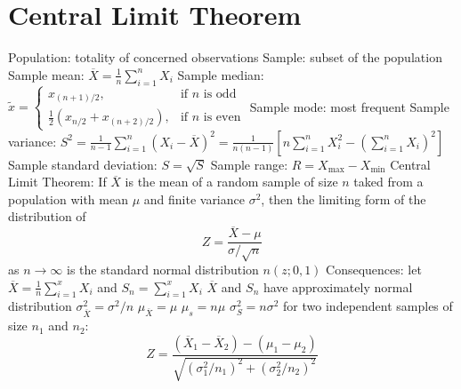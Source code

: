 \documentclass[a4paper,11pt]{article}
\begin{document}
	\section{Central Limit Theorem}
	\begin{outline}[enumerate]
		\1 Population: totality of concerned observations
		\1 Sample: subset of the population
			\2 Sample mean: $\overline{X} = \frac{1}{n}\sum_{i = 1}^{n} X_{i}$	
			\2 Sample median: $\tilde{x} = \left\{\begin{array}{ll}
				x_{\left(n + 1\right)/2}, & \text{if $n$ is odd} \\
				\frac{1}{2}\left(x_{n/2} + x_{\left(n + 2\right)/2}\right), & \text{if $n$ is even}
			\end{array} \right.$ 
			\2 Sample mode: most frequent
			\2 Sample variance: $S^2 = \frac{1}{n - 1}\sum_{i = 1}^{n} \left(X_{i} - \overline{X}\right)^{2} = \frac{1}{n\left(n - 1\right)} \left[n\sum_{i = 1}^{n}X_{i}^{2} - \left(\sum_{i = 1}^{n} X_{i}\right)^2\right]$
			\2 Sample standard deviation: $S = \sqrt{S}$
			\2 Sample range: $R = X_{\text{max}} - X_{\text{min}}$
		\1 Central Limit Theorem: If $\overline{X}$ is the mean of a random sample of size $n$ taked from a population with mean $\mu$ and finite variance $\sigma^{2}$, then the limiting form of the distribution of 
		\begin{equation}
			Z = \frac{\overline{X} - \mu}{\sigma / \sqrt{n}}
		\end{equation}	
		as $n \to \infty$ is the standard normal distribution $n\left(z; 0, 1\right)$
		\1 Consequences:
			\2 let $\overline{X} = \frac{1}{n}\sum_{i = 1}^{x} X_{i}$ and $S_{n} = \sum_{i = 1}^{x} X_{i}$
			\2 $\overline{X}$ and $S_{n}$ have approximately normal distribution
			\2 $\sigma_{\overline{X}}^{2} = \sigma^{2}/n$
			\2 $\mu_{\overline{X}} = \mu$
			\2 $\mu_{s} = n\mu$
			\2 $\sigma_{S}^{2} = n\sigma^2$
		\1 for two independent samples of size $n_{1}$ and $n_{2}$:
		\begin{equation}
			Z = \frac{\left(\overline{X}_{1} - \overline{X}_{2}\right) - \left(\mu_{1} - \mu_{2}\right)}{\sqrt{\left(\sigma_{1}^{2} / n_{1}\right)^{2} + \left(\sigma_{2}^{2} / n_{2}\right)^{2}}}
		\end{equation}	
	\end{outline}
	
\end{document}
